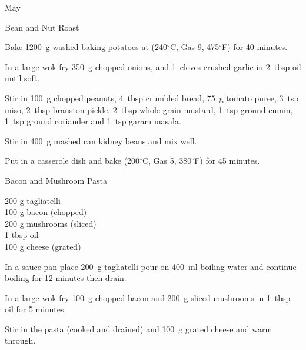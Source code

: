 \begin{menu}{May}
\begin{recipe}{2}{Bean and Nut Roast}
    \begin{instructions}
    \item 
    Bake
    1200~g washed baking potatoes
    at
    (240$^{\circ}$C, Gas 9, 475$^{\circ}$F) for 40 minutes.
  \item 
        In a large wok fry
        350~g chopped onions,
        and
        1~cloves crushed garlic
        in
        2~tbsp  oil
        until soft.
      \item 
        Stir in
        100~g chopped peanuts,
        4~tbsp crumbled bread,
        75~g  tomato puree,
        3~tsp  miso,
        2~tbsp  branston pickle,
        2~tbsp  whole grain mustard,
        1~tsp  ground cumin,
        1~tsp  ground coriander
        and
        1~tsp  garam masala.
      \item 
        Stir in
        400~g mashed can kidney beans
        and mix well.
      \item 
        Put in a casserole dish and
        bake (200$^{\circ}$C, Gas 5, 380$^{\circ}$F) for 45 minutes.
      
    \end{instructions}
    \end{recipe}%
  
    \begin{recipe}{1}{Bacon and Mushroom Pasta}%
		\begin{ingredients}
		200 g tagliatelli  \\
	100 g bacon (chopped) \\
	200 g mushrooms (sliced) \\
	1 tbsp oil  \\
	100 g cheese (grated) \\
	
		\end{ingredients}
	
	
    \begin{instructions}
    \item 
    In a
    sauce pan
    place
    200~g  tagliatelli
    pour on
    400~ml  boiling water and continue boiling for 12 minutes then drain.
  \item 
        In a large wok fry 100~g chopped bacon
        and
        200~g sliced mushrooms
        in
        1~tbsp  oil for 5 minutes.
      \item 
        Stir in the pasta (cooked and drained)
        and 100~g grated cheese
        and warm through.
      

\end{instructions}
\end{recipe}
\end{menu}
